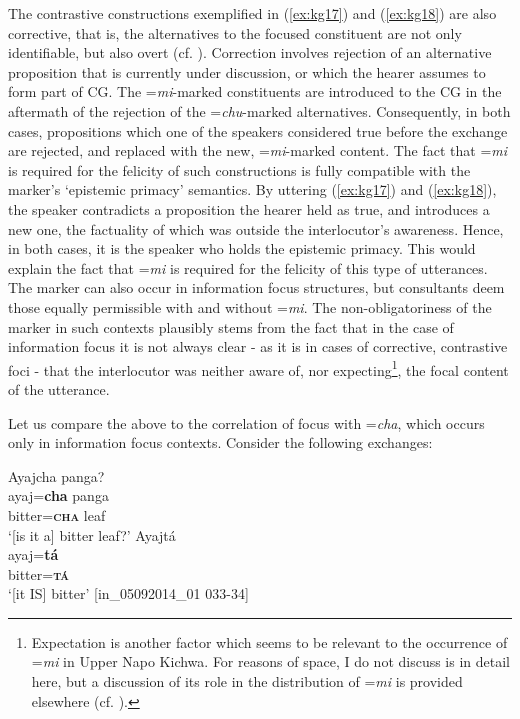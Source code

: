 \documentclass[output=paper]{langscibook}
\begin{document}
The contrastive constructions exemplified in (\ref{ex:kg17}) and (\ref{ex:kg18}) are also corrective, that is, the alternatives to the focused constituent are not only identifiable, but also overt (cf. \citealt{Repp2010}).  Correction involves rejection of an alternative proposition that is currently under discussion, or which the hearer assumes to form part of CG. The =\textit{mi}-marked constituents are introduced to the CG in the aftermath of the rejection of the =\textit{chu}-marked alternatives. Consequently, in both cases, propositions which one of the speakers considered true before the exchange are rejected, and replaced with the new, =\textit{mi}-marked content. The fact that =\textit{mi} is required for the felicity of such constructions is fully compatible with the marker’s ‘epistemic primacy’ semantics. By uttering (\ref{ex:kg17}) and (\ref{ex:kg18}), the speaker contradicts a proposition the hearer held as true, and introduces a new one, the factuality of which was outside the interlocutor’s awareness. Hence, in both cases, it is the speaker who holds the epistemic primacy. This would explain the fact that =\textit{mi} is required for the felicity of this type of utterances. The marker can also occur in information focus structures, but consultants deem those equally permissible with and without =\textit{mi}. The non-obligatoriness of the marker in such contexts plausibly stems from the fact that in the case of information focus it is not always clear - as it is in cases of corrective, contrastive foci - that the interlocutor was neither aware of, nor expecting\footnote{Expectation is another factor which seems to be relevant to the occurrence of =\textit{mi} in Upper Napo Kichwa. For reasons of space, I do not discuss is in detail here, but a discussion of its role in the distribution of =\textit{mi} is provided elsewhere (cf. \citealt[ch.6]{Grzech2016a}).}, the focal content of the utterance.

Let us compare the above to the correlation of focus with =\textit{cha}, which occurs only in information focus contexts. Consider the following exchanges: 


\begin{exe}
	\ex \label{ex:kg19}
	\begin{xlist}
		\ex \label{ex:kg19a}
		\glll Ayajcha panga?\\
		ayaj=\textbf{cha} panga\\
		bitter=\textbf{\textsc{cha}}   leaf\\
		\trans ‘[is it a] bitter leaf?’
		\ex  \label{ex:kg19b}
		\glll Ayajtá\\
		ayaj=\textbf{tá}\\
        bitter=\textbf{\textsc{tá}}\\
        \trans ‘[it IS]  bitter’ [in\_05092014\_01   033-34]
	\end{xlist}
\end{exe}
\end{document}
